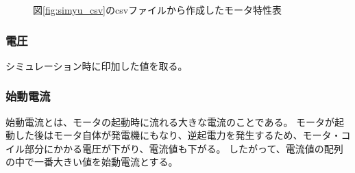 \begin{figure}[t]
	\centering
	\caption{図\ref{fig:simyu_csv}のcsvファイルから作成したモータ特性表}
	\label{fig:tokuseihyou}
\end{figure}

\subsubsection{電圧}\label{sub:sub:dennatu}
シミュレーション時に印加した値を取る。

\subsubsection{始動電流}\label{sub:sub:sidouden}
始動電流とは、モータの起動時に流れる大きな電流のことである。
モータが起動した後はモータ自体が発電機にもなり、逆起電力を発生するため、モータ・コイル部分にかかる電圧が下がり、電流値も下がる。
したがって、電流値の配列の中で一番大きい値を始動電流とする。


